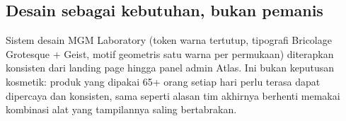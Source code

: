 \FloatBarrier
\subsection{Desain sebagai kebutuhan, bukan pemanis}

Sistem desain MGM Laboratory (token warna tertutup, tipografi Bricolage Grotesque + Geist, motif geometris satu warna per permukaan) diterapkan konsisten dari landing page hingga panel admin Atlas. Ini bukan keputusan kosmetik: produk yang dipakai 65+ orang setiap hari perlu terasa dapat dipercaya dan konsisten, sama seperti alasan tim akhirnya berhenti memakai kombinasi alat yang tampilannya saling bertabrakan.
